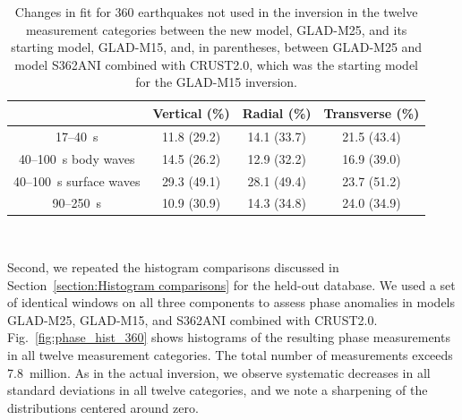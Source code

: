 \documentclass[extra,mreferee]{gji}
\begin{document}
\begin{table}[!htb]
  \centering
  \begin{tabular}{|c|c|c|c|}
  \hline
  ~          &  Vertical (\%) & Radial (\%) &  Transverse (\%) \\
  \hline
  17--40~s                &          11.8 (29.2) &       14.1 (33.7) &       21.5 (43.4) \\
  40--100~s body waves    &          14.5 (26.2) &       12.9 (32.2)  &       16.9 (39.0) \\
  40--100~s surface waves &          29.3 (49.1) &       28.1 (49.4) &       23.7 (51.2) \\
  90--250~s               &          10.9 (30.9) &       14.3 (34.8)  &       24.0 (34.9) \\
  \hline
  \end{tabular}\\
  \caption{Changes in fit for 360 earthquakes not used in the inversion in the twelve measurement categories
between the new model, GLAD-M25, and its starting model, GLAD-M15, and, in parentheses, between GLAD-M25 and model S362ANI combined with CRUST2.0, which was the starting model for the GLAD-M15 inversion.}
  \label{table:misfit_reduction_M15_M25_360}
\end{table}


Second, we repeated the histogram comparisons discussed in
Section~\ref{section:Histogram comparisons} for the held-out database.
We used a set of identical windows on all three components to assess
phase anomalies in models GLAD-M25, GLAD-M15, and S362ANI combined with CRUST2.0.
Fig.~\ref{fig:phase_hist_360} shows histograms of the resulting phase
measurements in all twelve measurement categories.
The total number of measurements exceeds 7.8~million.
As in the actual inversion,
we observe systematic decreases in all standard deviations in all twelve categories,
and we note a sharpening of the distributions centered around zero.
\end{document}
